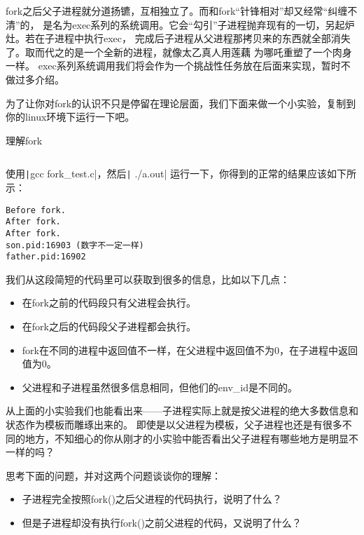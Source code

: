 fork之后父子进程就分道扬镳，互相独立了。而和fork“针锋相对”却又经常“纠缠不清”的，
是名为exec系列的系统调用。它会“勾引”子进程抛弃现有的一切，另起炉灶。若在子进程中执行exec，
完成后子进程从父进程那拷贝来的东西就全部消失了。取而代之的是一个全新的进程，就像太乙真人用莲藕
为哪吒重塑了一个肉身一样。
exec系列系统调用我们将会作为一个挑战性任务放在后面来实现，暂时不做过多介绍。

为了让你对fork的认识不只是停留在理论层面，我们下面来做一个小实验，复制到你的linux环境下运行一下吧。
\begin{codeBoxWithCaption}{理解fork\label{code:fork_test.c}}
  \inputminted[linenos]{c}{codes/fork_test.c}
\end{codeBoxWithCaption}

使用\texttt|gcc fork_test.c|，然后\texttt| ./a.out| 运行一下，你得到的正常的结果应该如下所示：
\begin{verbatim}
Before fork.
After fork.
After fork.
son.pid:16903 (数字不一定一样)
father.pid:16902
\end{verbatim}

我们从这段简短的代码里可以获取到很多的信息，比如以下几点：
\begin{itemize}
 \item 在fork之前的代码段只有父进程会执行。
 \item 在fork之后的代码段父子进程都会执行\label{fork与子进程}。
 \item fork在不同的进程中返回值不一样，在父进程中返回值不为0，在子进程中返回值为0。
 \item 父进程和子进程虽然很多信息相同，但他们的env\_id是不同的。
\end{itemize}

从上面的小实验我们也能看出来——子进程实际上就是按父进程的绝大多数信息和状态作为模板而雕琢出来的。
即使是以父进程为模板，父子进程也还是有很多不同的地方，不知细心的你从刚才的小实验中能否看出父子进程有哪些地方是明显不一样的吗？

\begin{thinking}
 思考下面的问题，并对这两个问题谈谈你的理解：
  \begin{itemize}
   \item 子进程完全按照fork()之后父进程的代码执行，说明了什么？
   \item 但是子进程却没有执行fork()之前父进程的代码，又说明了什么？
  \end{itemize}
\end{thinking}


